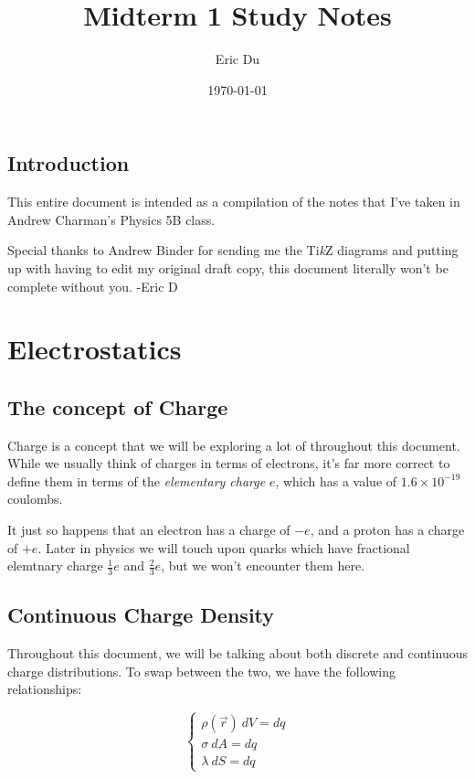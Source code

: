 \documentclass{report}
\title{Midterm 1 Study Notes}
\author{Eric Du}
\date{\today}
\theoremstyle{definition}
\numberwithin{equation}{section}
\numberwithin{definition}{section}
\begin{document}
    \maketitle

\section{Introduction}
    This entire document is intended as a compilation of the notes that I've taken in Andrew Charman's Physics 5B class. 

    Special thanks to Andrew Binder for sending me the Ti\textit{k}Z diagrams and putting up with having to edit my original draft copy, this document literally won't be complete without you. -Eric D


\chapter{Electrostatics}

\section{The concept of Charge}

Charge is a concept that we will be exploring a lot of throughout this document. While we usually think of charges in terms of electrons, it's far more correct to define them in terms of the \textit{elementary charge} $e$, which has a value of $1.6 \times 10^{-19}$ coulombs. 

It just so happens that an electron has a charge of $-e$, and a proton has a charge of $+e$. Later in physics we will touch upon quarks which have fractional elemtnary charge $\frac{1}{3}e$ and $\frac{2}{3}e$, but we won't encounter them here.

\section{Continuous Charge Density}

Throughout this document, we will be talking about both discrete and continuous charge distributions. To swap between the two, we have the following relationships:

\[ \begin{cases}
    \rho(\vec{r}) \  dV = dq\\
    \sigma \ dA = dq\\
    \lambda \ dS = dq
\end{cases}\]
\end{document}
